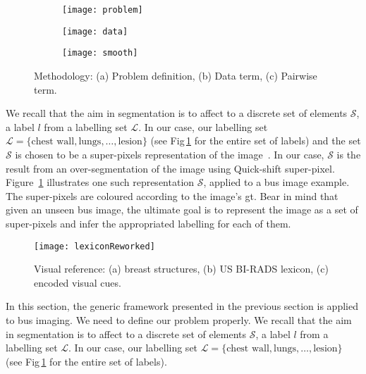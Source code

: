 {\begin{figure}
    \centering
    \begin{subfigure}[b]{0.19\textwidth}
        \centering
        \texttt{[image: problem]}
        \label{fig:methodTerms:problem}
    \end{subfigure}
    \hfill
    \begin{subfigure}[b]{0.39\textwidth}  
        \centering 
        \texttt{[image: data]}
        \label{fig:methodTerms:data}
    \end{subfigure}
    \hfill
    \begin{subfigure}[b]{0.39\textwidth}   
        \centering 
        \texttt{[image: smooth]} 
        \label{fig:methodTerms:boundary}
    \end{subfigure}
    \caption {\small Methodology: (a) Problem definition, (b) Data term, (c) Pairwise term.} 
    \label{fig:methodterms}
\end{figure}


 We recall that the aim in segmentation is to affect to a discrete set of elements $\mathcal{S}$, a label $l$ from a labelling set $\mathcal{L}$. In our case, our labelling set $\mathcal{L} = \{ \text{chest wall}, \text{lungs}, \dots, \text{lesion} \}$ (see Fig\,\ref{fig:methodTerms:problem} for the entire set of labels) and the set $\mathcal{S}$ is chosen to be a super-pixels representation of the image~\cite{achanta2012slic}. In our case, $\mathcal{S}$ is the result from an over-segmentation of the image using Quick-shift super-pixel. Figure~\ref{fig:methodTerms:problem} illustrates one such representation $\mathcal{S}$, applied to a \ac{bus} image example. The super-pixels are coloured according to the image's \ac{gt}. Bear in mind that given an unseen \ac{bus} image, the ultimate goal is to represent the image as a set of super-pixels and infer the appropriated labelling for each of them.

\begin{figure}
  \texttt{[image: lexiconReworked]}
    \caption {{\footnotesize Visual reference: (a) breast structures, (b) US BI-RADS lexicon, (c) encoded visual cues.}} 
    \label{fig:features}
\end{figure}

In this section, the generic framework presented in the previous section is applied to \ac{bus} imaging. We need to define our problem properly. We recall that the aim in segmentation is to affect to a discrete set of elements $\mathcal{S}$, a label $l$ from a labelling set $\mathcal{L}$. In our case, our labelling set $\mathcal{L} = \{ \text{chest wall}, \text{lungs}, \dots, \text{lesion} \}$ (see Fig\,\ref{fig:methodTerms:problem} for the entire set of labels).

}
